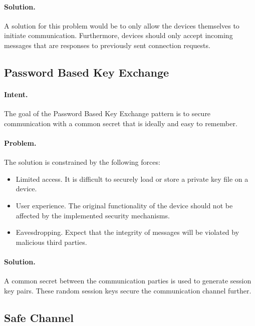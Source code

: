 \paragraph{\textbf{Solution.}} A solution for this problem would be to only allow the devices themselves to initiate communication. Furthermore, devices should only accept incoming messages that are responses to previously sent connection requests. 


\subsection{Password Based Key Exchange~\cite{Sinnhofer2016}} 
\label{p:keyex}

\paragraph{\textbf{Intent.}} The goal of the Password Based Key Exchange pattern is to secure communication with a common secret that is ideally  and easy to remember.

\paragraph{\textbf{Problem.}} The solution is constrained by the following forces:
\begin{itemize}
	\item Limited access. It is difficult to securely load or store a private key file on a device. 
	\item User experience. The original functionality of the device should not be affected by the implemented security mechanisms.
	\item Eavesdropping. Expect that the integrity of messages will be violated by malicious third parties.
\end{itemize}

\paragraph{\textbf{Solution.}} A common secret between the communication parties is used to generate session key pairs. These random session keys secure the communication channel further. 


\subsection{Safe Channel~\cite{Papoutsakis2021}} 
\label{p:sc}

